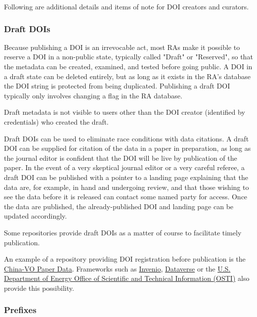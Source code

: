 \documentclass[11pt,a4paper]{ivoa}
\begin{document}
Following are additional details and items of note for DOI creators and curators.

\subsubsection{Draft DOIs}\hypertarget{draft-dois}{}\label{sec:draft-dois}

Because publishing a DOI is an irrevocable act, most RAs make it possible to reserve a DOI in a non-public state, typically called "Draft" or "Reserved", so that the metadata can be created, examined, and tested before going public. A DOI in a draft state can be deleted entirely, but as long as it exists in the RA's database the DOI string is protected from being duplicated. Publishing a draft DOI typically only involves changing a flag in the RA database.

Draft metadata is not visible to users other than the DOI creator (identified by credentials) who created the draft.

Draft DOIs can be used to eliminate race conditions with data citations. A draft DOI can be supplied for citation of the data in a paper in preparation, as long as the journal editor is confident that the DOI will be live by publication of the paper. In the event of a very skeptical journal editor or a very careful referee, a draft DOI can be published with a pointer to a landing page explaining that the data are, for example, in hand and undergoing review, and that those wishing to see the data before it is released can contact some named party for access. Once the data are published, the already-published DOI and landing page can be updated accordingly.

Some repositories provide draft DOIs as a matter of course to facilitate timely publication.

An example of a repository providing DOI registration before publication is the \href{https://nadc.china-vo.org/res/paperdata/}{China-VO Paper Data}. Frameworks such as \href{https://inveniosoftware.org/}{Invenio},  \href{https://dataverse.org/}{Dataverse} or the \href{https://www.osti.gov/}{U.S. Department of Energy Office of Scientific and  Technical Information (OSTI)} also provide this possibility.

\subsubsection{Prefixes}\hypertarget{prefixes}{}\label{sec:prefixes}
\end{document}
